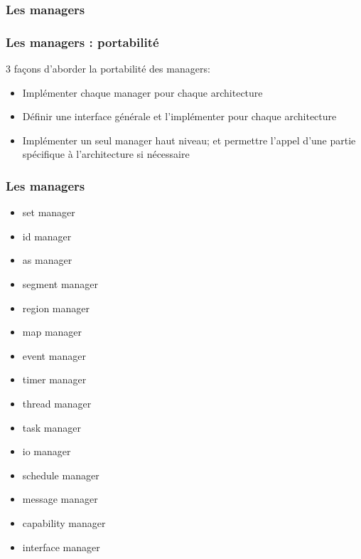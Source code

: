 
\begin{frame}
 \frametitle{Les managers}

  \begin{center}
  \end{center}

\end{frame}


\begin{frame}
  \frametitle{Les managers : portabilit\'e}

   3 fa\c{c}ons d'aborder la portabilit\'e des managers:

   \begin{itemize}
   \item
     Impl\'ementer chaque manager pour chaque architecture
   \item
     D\'efinir une interface g\'en\'erale et l'impl\'ementer pour chaque architecture
   \item
     Impl\'ementer un seul manager haut niveau; et permettre l'appel d'une partie sp\'ecifique
     \`a l'architecture si n\'ecessaire
   \end{itemize}

\end{frame}


\begin{frame}
 \frametitle{Les managers}

  \begin{itemize}
    \item set manager
    \item id manager
    \item as manager
    \item segment manager
    \item region manager
    \item map manager
    \item event manager
    \item timer manager
    \item thread manager
    \item task manager
    \item io manager
    \item schedule manager
    \item message manager
    \item capability manager
    \item interface manager
    \end{itemize}

\end{frame}


